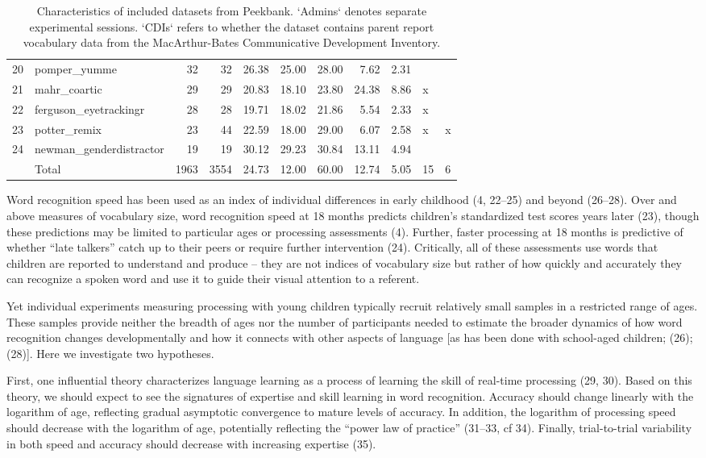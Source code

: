 \documentclass[9pt,twocolumn,twoside,]{pnas-new}
\begin{document}
\begin{table}[ht]
\begin{tabular}{rlrrrrrrrll}
  20 & pomper\_yumme &  32 &  32 & 26.38 & 25.00 & 28.00 & 7.62 & 2.31 &  &  \\ 
  21 & mahr\_coartic &  29 &  29 & 20.83 & 18.10 & 23.80 & 24.38 & 8.86 & x &  \\ 
  22 & ferguson\_eyetrackingr &  28 &  28 & 19.71 & 18.02 & 21.86 & 5.54 & 2.33 & x &  \\ 
  23 & potter\_remix &  23 &  44 & 22.59 & 18.00 & 29.00 & 6.07 & 2.58 & x & x \\ 
  24 & newman\_genderdistractor &  19 &  19 & 30.12 & 29.23 & 30.84 & 13.11 & 4.94 &  &  \\ 
  \hline
    & Total & 1963 & 3554 & 24.73 & 12.00 & 60.00 & 12.74 & 5.05 & 15 & 6 \\ 
   \hline
\end{tabular}
\caption{Characteristics of included datasets from Peekbank. `Admins` denotes separate experimental sessions. `CDIs` refers to whether the dataset contains parent report vocabulary data from the MacArthur-Bates Communicative Development Inventory.} 
\end{table}

Word recognition speed has been used as an index of individual
differences in early childhood (4, 22--25) and beyond (26--28). Over and
above measures of vocabulary size, word recognition speed at 18 months
predicts children's standardized test scores years later (23), though
these predictions may be limited to particular ages or processing
assessments (4). Further, faster processing at 18 months is predictive
of whether ``late talkers'' catch up to their peers or require further
intervention (24). Critically, all of these assessments use words that
children are reported to understand and produce -- they are not indices
of vocabulary size but rather of how quickly and accurately they can
recognize a spoken word and use it to guide their visual attention to a
referent.

Yet individual experiments measuring processing with young children
typically recruit relatively small samples in a restricted range of
ages. These samples provide neither the breadth of ages nor the number
of participants needed to estimate the broader dynamics of how word
recognition changes developmentally and how it connects with other
aspects of language {[}as has been done with school-aged children; (26);
(28){]}. Here we investigate two hypotheses.

First, one influential theory characterizes language learning as a
process of learning the skill of real-time processing (29, 30). Based on
this theory, we should expect to see the signatures of expertise and
skill learning in word recognition. Accuracy should change linearly with
the logarithm of age, reflecting gradual asymptotic convergence to
mature levels of accuracy. In addition, the logarithm of processing
speed should decrease with the logarithm of age, potentially reflecting
the ``power law of practice'' (31--33, cf 34). Finally, trial-to-trial
variability in both speed and accuracy should decrease with increasing
expertise (35).
\end{document}
